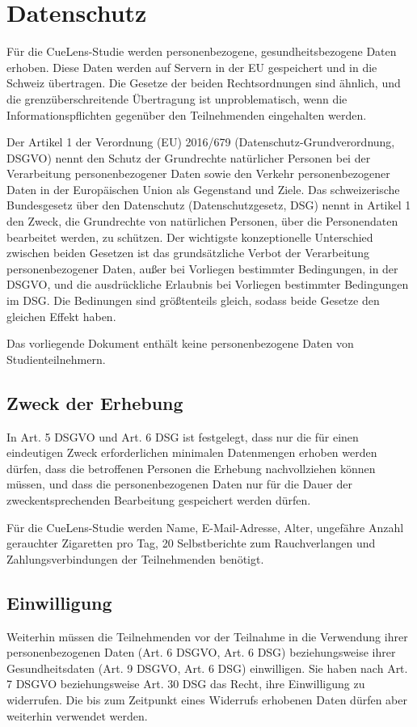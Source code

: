 \section{Datenschutz}
Für die CueLens-Studie werden personenbezogene, gesundheitsbezogene Daten erhoben. Diese Daten werden auf Servern in der EU gespeichert und in die Schweiz übertragen. Die Gesetze der beiden Rechtsordnungen sind ähnlich, und die grenzüberschreitende Übertragung ist unproblematisch, wenn die Informationspflichten gegenüber den Teilnehmenden eingehalten werden.

Der Artikel 1 der Verordnung (EU) 2016/679 (Datenschutz-Grundverordnung, DSGVO) nennt den Schutz der Grundrechte natürlicher Personen bei der Verarbeitung personenbezogener Daten sowie den Verkehr personenbezogener Daten in der Europäischen Union als Gegenstand und Ziele. Das schweizerische Bundesgesetz über den Datenschutz (Datenschutzgesetz, DSG) nennt in Artikel 1 den Zweck, die Grundrechte von natürlichen Personen, über die Personendaten bearbeitet werden, zu schützen. Der wichtigste konzeptionelle Unterschied zwischen beiden Gesetzen ist das grundsätzliche Verbot der Verarbeitung personenbezogener Daten, außer bei Vorliegen bestimmter Bedingungen, in der DSGVO, und die ausdrückliche Erlaubnis bei Vorliegen bestimmter Bedingungen im DSG. Die Bedinungen sind größtenteils gleich, sodass beide Gesetze den gleichen Effekt haben.

Das vorliegende Dokument enthält keine personenbezogene Daten von Studienteilnehmern.

\subsection{Zweck der Erhebung}
In Art. 5 DSGVO und Art. 6 DSG ist festgelegt, dass nur die für einen eindeutigen Zweck erforderlichen minimalen Datenmengen erhoben werden dürfen, dass die betroffenen Personen die Erhebung nachvollziehen können müssen, und dass die personenbezogenen Daten nur für die Dauer der zweckentsprechenden Bearbeitung gespeichert werden dürfen. 

Für die CueLens-Studie werden Name, E-Mail-Adresse, Alter, ungefähre Anzahl gerauchter Zigaretten pro Tag, 20 Selbstberichte zum Rauchverlangen und Zahlungsverbindungen der Teilnehmenden benötigt. 

\subsection{Einwilligung}
Weiterhin müssen die Teilnehmenden vor der Teilnahme in die Verwendung ihrer personenbezogenen Daten (Art. 6 DSGVO, Art. 6 DSG) beziehungsweise ihrer Gesundheitsdaten (Art. 9 DSGVO, Art. 6 DSG) einwilligen. Sie haben nach Art. 7 DSGVO beziehungsweise Art. 30 DSG das Recht, ihre Einwilligung zu widerrufen. Die bis zum Zeitpunkt eines Widerrufs erhobenen Daten dürfen aber weiterhin verwendet werden. 

